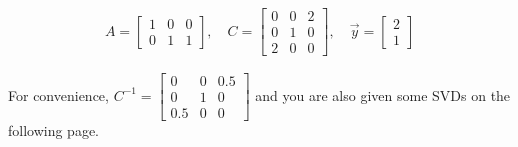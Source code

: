 \begin{align*}
A = \begin{bmatrix}
1 & 0 & 0 \\
0& 1 & 1
\end{bmatrix}, \quad
C = \begin{bmatrix}
0 & 0 & 2\\
0 & 1 & 0 \\
2 & 0 & 0
\end{bmatrix}, \quad 
\vec{y} = \begin{bmatrix}
2 \\
1
\end{bmatrix}
\end{align*}

For convenience, $C^{-1} = \begin{bmatrix}
0 & 0 & 0.5\\
0 & 1 & 0 \\
0.5 & 0 & 0
\end{bmatrix}$ and you are also given some SVDs on the following page.

